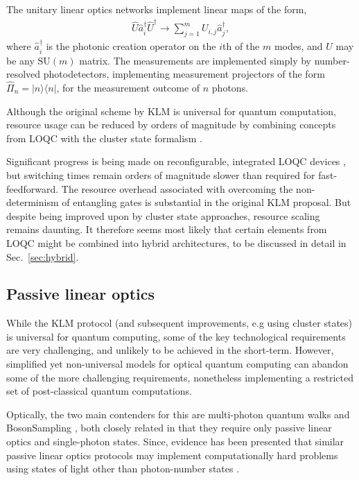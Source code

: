 \documentclass[aps,rmp,twocolumn,amsmath,amssymb,nofootinbib,superscriptaddress]{revtex4}
\newcommand{\bra}[1]{\langle#1|}
\newcommand{\ket}[1]{|#1\rangle}
\begin{document}
The unitary linear optics networks implement linear maps of the form,
\begin{align}
\hat{U}\hat{a}_i^\dag \hat{U}^\dag \to \sum_{j=1}^m U_{i,j} \hat{a}^\dag_j,
\end{align}
where $\hat{a}^\dag_i$ is the photonic creation operator on the $i$th of the $m$ modes, and $U$ may be any $\mathrm{SU}(m)$ matrix. The measurements are implemented simply by number-resolved photodetectors, implementing measurement projectors of the form \mbox{$\hat\Pi_n=\ket{n}\bra{n}$}, for the measurement outcome of $n$ photons.

Although the original scheme by KLM is universal for quantum computation, resource usage can be reduced by orders of magnitude by combining concepts from LOQC with the cluster state formalism \cite{bib:Nielsen04, bib:BrowneRudolph05}.

Significant progress is being made on reconfigurable, integrated LOQC devices \cite{bib:UniversalLOOBrien}, but switching times remain orders of magnitude slower than required for fast-feedforward. The resource overhead associated with overcoming the non-determinism of entangling gates is substantial in the original KLM proposal. But despite being improved upon by cluster state approaches, resource scaling remains daunting. It therefore seems most likely that certain elements from LOQC might be combined into hybrid architectures, to be discussed in detail in Sec.~\ref{sec:hybrid}.

%
%

\subsection{Passive linear optics} \label{sec:BS}

While the KLM protocol (and subsequent improvements, e.g using cluster states) is universal for quantum computing, some of the key technological requirements are very challenging, and unlikely to be achieved in the short-term. However, simplified yet non-universal models for optical quantum computing can abandon some of the more challenging requirements, nonetheless implementing a restricted set of post-classical quantum computations.

Optically, the two main contenders for this are multi-photon quantum walks \cite{bib:Aharonov93, bib:Aharonov01, bib:Kempe03, bib:Salvador12, bib:RohdeMultiWalk11} and {\sc BosonSampling} \cite{bib:AaronsonArkhipov10, bib:RohdeIntroBS15}, both closely related in that they require only passive linear optics and single-photon states. Since, evidence has been presented that similar passive linear optics protocols may implement computationally hard problems using states of light other than photon-number states \cite{bib:RandBS, bib:RohdePhotAdd15, bib:RohdeDisp15, bib:RohdeCat15}.
\end{document}
